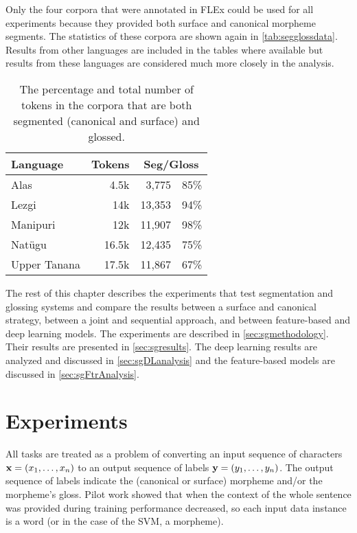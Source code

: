 Only the four corpora that were annotated in FLEx could be used for all experiments because they provided both surface and canonical morpheme segments. The statistics of these corpora are shown again in \autoref{tab:segglossdata}. Results from other languages are included in the tables where available but results from these languages are considered much more closely in the analysis. 

\begin{table}[!tb]
    \centering
    \begin{tabular}{l|r|rc}
         \textbf{Language} & \textbf{Tokens} & \multicolumn{2}{c}{\textbf{Seg/Gloss}} \\
         \hline
         Alas & 4.5k & 3,775 & 85\%  \\
         \hline
         Lezgi & 14k & 13,353  & 94\% \\
         \hline
         Manipuri & 12k & 11,907 & 98\% \\
         \hline
         Natügu & 16.5k & 12,435 & 75\%  \\
         \hline
         Upper Tanana & 17.5k & 11,867 & 67\% 
    \end{tabular}
    \caption[Data for Segmentation and Glossing Experimentation]{The percentage and total number of tokens in the corpora that are both segmented (canonical and surface) and glossed.}
    \label{tab:segglossdata}
\end{table}

The rest of this chapter describes the experiments that test segmentation and glossing systems and compare the results between a surface and canonical strategy, between a joint and sequential approach, and between feature-based and deep learning models. The experiments are described in \autoref{sec:sgmethodology}. Their results are presented in \autoref{sec:sgresults}. The deep learning results are analyzed and discussed in \autoref{sec:sgDLanalysis} and the feature-based models are discussed in \autoref{sec:sgFtrAnalysis}. 


\section{Experiments}
\label{sec:sgmethodology}

All tasks are treated as a problem of converting an input sequence of characters $\mathbf{x} = (x_1, \ldots, x_n)$ to an output sequence of labels $\mathbf{y} = (y_1, \ldots, y_n)$. The output sequence of labels indicate the (canonical or surface) morpheme and/or the morpheme's gloss. Pilot work showed that when the context of the whole sentence was provided during training performance decreased, so each input data instance is a word (or in the case of the SVM, a morpheme). 


